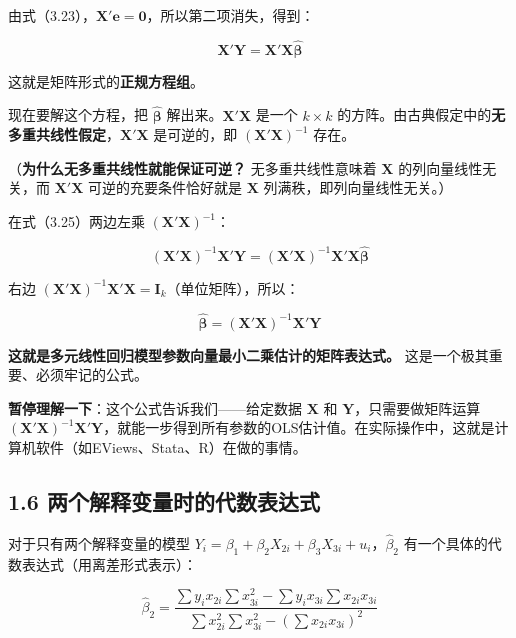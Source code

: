 \documentclass[12pt,a4paper]{ctexart}
\begin{document}
由式（3.23），$\mathbf{X}'\mathbf{e} = \mathbf{0}$，所以第二项消失，得到：

\begin{equation}
\mathbf{X}'\mathbf{Y} = \mathbf{X}'\mathbf{X}\hat{\boldsymbol{\beta}} \tag{3.25}
\end{equation}

这就是矩阵形式的\textbf{正规方程组}。

现在要解这个方程，把 $\hat{\boldsymbol{\beta}}$ 解出来。$\mathbf{X}'\mathbf{X}$ 是一个 $k \times k$ 的方阵。由古典假定中的\textbf{无多重共线性假定}，$\mathbf{X}'\mathbf{X}$ 是可逆的，即 $(\mathbf{X}'\mathbf{X})^{-1}$ 存在。

（\textbf{为什么无多重共线性就能保证可逆？} 无多重共线性意味着 $\mathbf{X}$ 的列向量线性无关，而 $\mathbf{X}'\mathbf{X}$ 可逆的充要条件恰好就是 $\mathbf{X}$ 列满秩，即列向量线性无关。）

在式（3.25）两边左乘 $(\mathbf{X}'\mathbf{X})^{-1}$：

\[
(\mathbf{X}'\mathbf{X})^{-1} \mathbf{X}'\mathbf{Y} = (\mathbf{X}'\mathbf{X})^{-1} \mathbf{X}'\mathbf{X}\hat{\boldsymbol{\beta}}
\]

右边 $(\mathbf{X}'\mathbf{X})^{-1} \mathbf{X}'\mathbf{X} = \mathbf{I}_k$（单位矩阵），所以：

\begin{equation}
\hat{\boldsymbol{\beta}} = (\mathbf{X}'\mathbf{X})^{-1}\mathbf{X}'\mathbf{Y} \tag{3.26}
\end{equation}

\textbf{这就是多元线性回归模型参数向量最小二乘估计的矩阵表达式。} 这是一个极其重要、必须牢记的公式。

\textbf{暂停理解一下}：这个公式告诉我们——给定数据 $\mathbf{X}$ 和 $\mathbf{Y}$，只需要做矩阵运算 $(\mathbf{X}'\mathbf{X})^{-1}\mathbf{X}'\mathbf{Y}$，就能一步得到所有参数的OLS估计值。在实际操作中，这就是计算机软件（如EViews、Stata、R）在做的事情。

\subsection{1.6 两个解释变量时的代数表达式}

对于只有两个解释变量的模型 $Y_i = \beta_1 + \beta_2 X_{2i} + \beta_3 X_{3i} + u_i$，$\hat{\beta}_2$ 有一个具体的代数表达式（用离差形式表示）：

\begin{equation}
\hat{\beta}_2 = \frac{\sum y_i x_{2i} \sum x_{3i}^2 - \sum y_i x_{3i} \sum x_{2i} x_{3i}}{\sum x_{2i}^2 \sum x_{3i}^2 - (\sum x_{2i} x_{3i})^2} \tag{3.27}
\end{equation}
\end{document}
